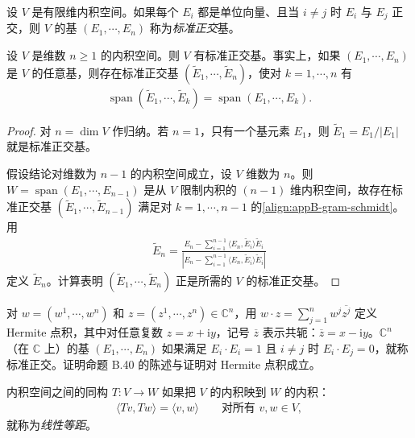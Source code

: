 \documentclass[../../main.tex]{subfiles}
\begin{document}
设 $V$ 是有限维内积空间。如果每个 $E_i$ 都是单位向量、且当 $i\neq j$ 时 $E_i$ 与 $E_j$ 正交，则 $V$ 的基 $(E_1,\cdots ,E_n)$ 称为\emph{标准正交}基。

\begin{proposition}\label{proposition:appB-gram-schmidt}
设 $V$ 是维数 $n\geqslant1$ 的内积空间。则 $V$ 有标准正交基。事实上，如果 $(E_1,\cdots ,E_n)$ 是 $V$ 的任意基，则存在标准正交基 $(\widetilde E_1,\cdots ,\widetilde E_n)$，使对 $k=1,\cdots ,n$ 有
\begin{align}\label{align:appB-gram-schmidt}
\operatorname{span}(\widetilde E_1,\cdots ,\widetilde E_k)=\operatorname{span}(E_1,\cdots ,E_k).
\end{align}
\end{proposition}

\begin{proof}
对 $n=\dim V$ 作归纳。若 $n=1$，只有一个基元素 $E_1$，则 $\widetilde E_1=E_1/|E_1|$ 就是标准正交基。

假设结论对维数为 $n-1$ 的内积空间成立，设 $V$ 维数为 $n$。则 $W=\operatorname{span}(E_1,\cdots ,E_{n-1})$ 是从 $V$ 限制内积的 $(n-1)$ 维内积空间，故存在标准正交基 $(\widetilde E_1,\cdots ,\widetilde E_{n-1})$ 满足对 $k=1,\cdots ,n-1$ 的\eqref{align:appB-gram-schmidt}。用
\begin{align}\label{align:appB-gs-step}
\widetilde E_n=\frac{E_n-\sum_{i=1}^{n-1}\langle E_n,\widetilde E_i\rangle\widetilde E_i}
{\left|E_n-\sum_{i=1}^{n-1}\langle E_n,\widetilde E_i\rangle\widetilde E_i\right|}
\end{align}
定义 $\widetilde E_n$。计算表明 $(\widetilde E_1,\cdots ,\widetilde E_n)$ 正是所需的 $V$ 的标准正交基。
\end{proof}

\begin{exercise}\label{exercise:appB-B-41}
对 $w=(w^1,\cdots ,w^n)$ 和 $z=(z^1,\cdots ,z^n)\in\mathbb C^n$，用 $w\cdot z=\sum_{j=1}^n w^j\overline{z^j}$ 定义 Hermite 点积，其中对任意复数 $z=x+\mathrm{i}y$，记号 $\overline{z}$ 表示共轭：$\overline{z}=x-\mathrm{i}y$。$\mathbb C^n$（在 $\mathbb C$ 上）的基 $(E_1,\cdots ,E_n)$ 如果满足 $E_i\cdot E_i=1$ 且 $i\neq j$ 时 $E_i\cdot E_j=0$，就称标准正交。证明命题 B.40 的陈述与证明对 Hermite 点积成立。
\end{exercise}

内积空间之间的同构 $T:V\to W$ 如果把 $V$ 的内积映到 $W$ 的内积：
\begin{align*}
\langle Tv,Tw\rangle=\langle v,w\rangle\qquad\text{对所有 }v,w\in V,
\end{align*}
就称为\emph{线性等距}。
\end{document}
